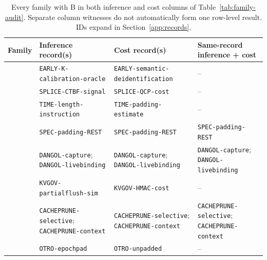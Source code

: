 \begin{table}[t]\centering\scriptsize
\caption{Every family with B in both inference and cost columns of Table~\ref{tab:family-audit}. Separate column witnesses do not automatically form one row-level result. IDs expand in Section~\ref{app:records}.}\label{tab:r33-crosswalk}
\begin{tabularx}{\textwidth}{@{}p{}YYY@{}}\toprule
Family & Inference record(s) & Cost record(s) & Same-record inference + cost\\\midrule
\cite{earlybird2025} & \texttt{EARLY-\allowbreak{}K-\allowbreak{}calibration-\allowbreak{}oracle} & \texttt{EARLY-\allowbreak{}semantic-\allowbreak{}deidentification} & --\\
\cite{spliceleak2026} & \texttt{SPLICE-\allowbreak{}CTBF-\allowbreak{}signal} & \texttt{SPLICE-\allowbreak{}QCP-\allowbreak{}cost} & --\\
\cite{timewilltell2024} & \texttt{TIME-\allowbreak{}length-\allowbreak{}instruction} & \texttt{TIME-\allowbreak{}padding-\allowbreak{}estimate} & --\\
\cite{wei2024speculation} & \texttt{SPEC-\allowbreak{}padding-\allowbreak{}REST} & \texttt{SPEC-\allowbreak{}padding-\allowbreak{}REST} & \texttt{SPEC-\allowbreak{}padding-\allowbreak{}REST}\\
\cite{dangol2026workflow} & \texttt{DANGOL-\allowbreak{}capture}; \texttt{DANGOL-\allowbreak{}livebinding} & \texttt{DANGOL-\allowbreak{}capture}; \texttt{DANGOL-\allowbreak{}livebinding} & \texttt{DANGOL-\allowbreak{}capture}; \texttt{DANGOL-\allowbreak{}livebinding}\\
\cite{addagada2026kvgov} & \texttt{KVGOV-\allowbreak{}partialflush-\allowbreak{}sim} & \texttt{KVGOV-\allowbreak{}HMAC-\allowbreak{}cost} & --\\
\cite{wu2026cacheprune} & \texttt{CACHEPRUNE-\allowbreak{}selective}; \texttt{CACHEPRUNE-\allowbreak{}context} & \texttt{CACHEPRUNE-\allowbreak{}selective}; \texttt{CACHEPRUNE-\allowbreak{}context} & \texttt{CACHEPRUNE-\allowbreak{}selective}; \texttt{CACHEPRUNE-\allowbreak{}context}\\
\cite{lee2026otro} & \texttt{OTRO-\allowbreak{}epochpad} & \texttt{OTRO-\allowbreak{}unpadded} & --\\
\bottomrule\end{tabularx}\end{table}
